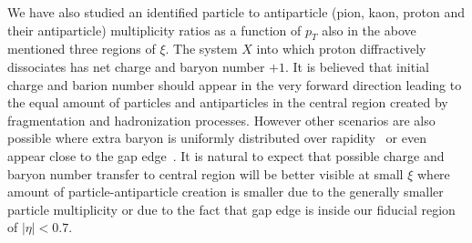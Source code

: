 We have also studied an identified particle to antiparticle (pion, kaon, proton and their antiparticle) multiplicity ratios as a function of $p_T$ also in the above mentioned three regions of $\xi$. The system $X$ into which proton diffractively dissociates has net charge and baryon number $+1$. It is believed that initial charge and barion number should appear in the very forward direction leading to the equal amount of particles and antiparticles in the central region created by fragmentation and hadronization processes. However other scenarios are also possible where extra baryon is uniformly distributed over rapidity~\cite{BaryonNoRapidity} or even appear close to the gap edge~\cite{Bopp:2000cr}. It is natural to expect that possible charge and baryon number transfer to central region will be better visible at small $\xi$ where amount of particle-antiparticle creation is smaller due to the generally smaller particle multiplicity or due to the fact that gap edge is inside our fiducial region of $|\eta|<0.7$.
